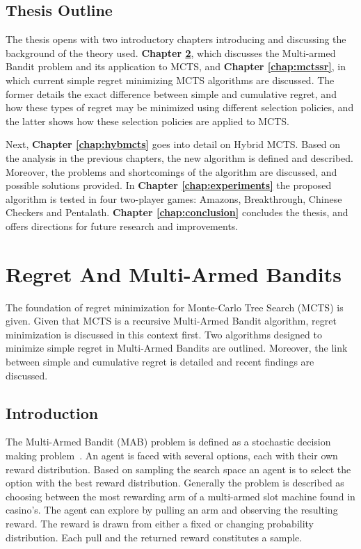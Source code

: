 \documentclass{kecsmstr}
\begin{document}
\section{Thesis Outline}

The thesis opens with two introductory chapters introducing and discussing the background of the theory used. \textbf{Chapter \ref{chap:mab}}, which discusses the Multi-armed Bandit problem and its application to MCTS, and \textbf{Chapter \ref{chap:mctssr}}, in which current simple regret minimizing MCTS algorithms are discussed. The former details the exact difference between simple and cumulative regret, and how these types of regret may be minimized using different selection policies, and the latter shows how these selection policies are applied to MCTS.

Next, \textbf{Chapter \ref{chap:hybmcts}} goes into detail on Hybrid MCTS. Based on the analysis in the previous chapters, the new algorithm is defined and described. Moreover, the problems and shortcomings of the algorithm are discussed, and possible solutions provided. In \textbf{Chapter \ref{chap:experiments}} the proposed algorithm is tested in four two-player games: Amazons, Breakthrough, Chinese Checkers and Pentalath. \textbf{Chapter \ref{chap:conclusion}} concludes the thesis, and offers directions for future research and improvements.

\chapter{Regret And Multi-Armed Bandits}
\label{chap:mab}
\begin{chaptercontents} The foundation of regret minimization for Monte-Carlo Tree Search (MCTS) is given. Given that MCTS is a recursive Multi-Armed Bandit algorithm, regret minimization is discussed in this context first. Two algorithms designed to minimize simple regret in Multi-Armed Bandits are outlined. Moreover, the link between simple and cumulative regret is detailed and recent findings are discussed. 
\end{chaptercontents}

\section{Introduction}
The Multi-Armed Bandit (MAB) problem is defined as a stochastic decision making problem~. An agent is faced with several options, each with their own reward distribution. Based on sampling the search space an agent is to select the option with the best reward distribution. Generally the problem is described as choosing between the most rewarding arm of a multi-armed slot machine found in casino's. The agent can explore by pulling an arm and observing the resulting reward. The reward is drawn from either a fixed or changing probability distribution. Each pull and the returned reward constitutes a sample.
\end{document}
